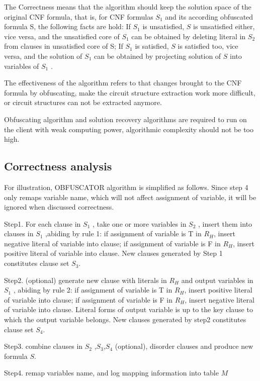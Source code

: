 \documentclass[runningheads,a4paper]{llncs}
\begin{document}
The Correctness means that the algorithm should keep the solution space of the original CNF formula, that is, for CNF formulas $S_1$  and its according obfuscated formula S, 
the following facts are hold: If $S_1$  is unsatisfied, $S$ is unsatisfied either, vice versa, and the unsatisfied core of $S_1$  can be obtained by deleting literal in $S_2$  from clauses in unsatisfied core of S;
If $S_1$  is satisfied, $S$ is satisfied too, vice versa, and the solution of $S_1$  can be obtained by projecting solution of $S$ into variables of $S_1$ . 

The effectiveness of the algorithm refers to that changes brought to the CNF formula by obfuscating, make the circuit structure extraction work more difficult, 
or circuit structures can not be extracted anymore. 

Obfuscating algorithm and solution recovery algorithms are required to run on the client with weak computing power, algorithmic complexity should not be too high.
\subsection{Correctness analysis}

For illustration, OBFUSCATOR algorithm is simplified as follows. Since step 4 only remaps variable name, which will not affect assignment of variable, 
it will be ignored when discussed correctness.

Step1. For each clause in $S_1$  , take one or more variables in $S_2$ , insert them into clauses in $S_1$ ,abiding by rule 1:
if assignment of variable is T in $R_H$, insert negative literal of variable into clause;
if assignment of variable is F in $R_H$, insert positive literal of variable into clause. 
New clauses generated by Step 1 constitutes clause set $S_3$.

Step2. (optional) generate new clause with literals in $R_H$ and output variables in $S_1$ , abiding by rule 2: 
if assignment of variable is T in $R_H$, insert positive literal of variable into clause;
if assignment of variable is F in $R_H$, insert negative literal of variable into clause.
Literal forms of output variable is up to the key clause to which the output variable belongs. 
New clauses generated by step2 constitutes clause set $S_4$.

Step3. combine clauses in $S_2$ ,$S_3$,$S_4$ (optional), disorder clauses and produce new formula $S$.

Step4. remap variables name, and log mapping information into table $M$ 
\end{document}
